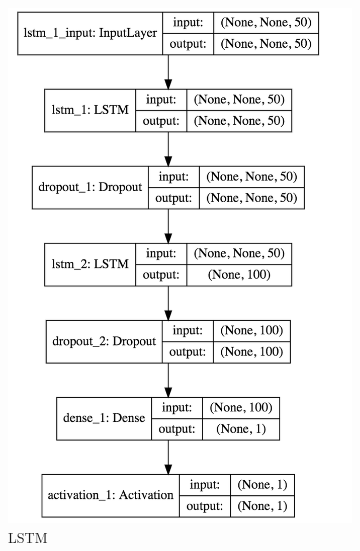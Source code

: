 \documentclass[11pt]{article}
\begin{document}
\begin{figure}
\begin{subfigure}[b]{0.3\textwidth}
        \includegraphics[width=\textwidth]{media/lstm-network}
        \caption{LSTM}
        \label{fig:lstm-network}
    \end{subfigure}
    ~ %
    \begin{subfigure}[b]{0.3\textwidth}

\end{subfigure}
\end{figure}
\end{document}
